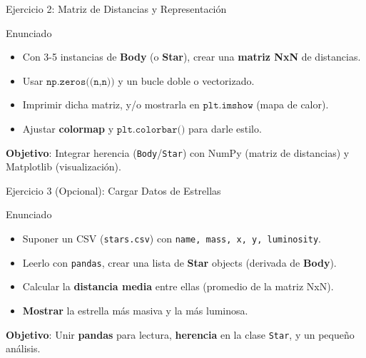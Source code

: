 \documentclass[10pt]{beamer}
\begin{document}
\begin{frame}{Ejercicio 2: Matriz de Distancias y Representación}
  \begin{block}{Enunciado}
    \begin{itemize}
      \item Con 3-5 instancias de \textbf{Body} (o \textbf{Star}), crear una \textbf{matriz NxN} de distancias.
      \item Usar \(\texttt{np.zeros((n,n))}\) y un bucle doble o vectorizado.
      \item Imprimir dicha matriz, y/o mostrarla en \(\texttt{plt.imshow}\) (mapa de calor).
      \item Ajustar \textbf{colormap} y \(\texttt{plt.colorbar()}\) para darle estilo.
    \end{itemize}
  \end{block}
  \textbf{Objetivo}: Integrar herencia (\texttt{Body}/\texttt{Star}) con NumPy (matriz de distancias) y Matplotlib (visualización).
\end{frame}

\begin{frame}{Ejercicio 3 (Opcional): Cargar Datos de Estrellas}
  \begin{block}{Enunciado}
    \begin{itemize}
      \item Suponer un CSV (\texttt{stars.csv}) con \texttt{name, mass, x, y, luminosity}.
      \item Leerlo con \texttt{pandas}, crear una lista de \textbf{Star} objects (derivada de \textbf{Body}).
      \item Calcular la \textbf{distancia media} entre ellas (promedio de la matriz NxN).
      \item \textbf{Mostrar} la estrella más masiva y la más luminosa.
    \end{itemize}
  \end{block}
  \textbf{Objetivo}: Unir \textbf{pandas} para lectura, \textbf{herencia} en la clase \texttt{Star}, y un pequeño análisis.
\end{frame}
\end{document}

